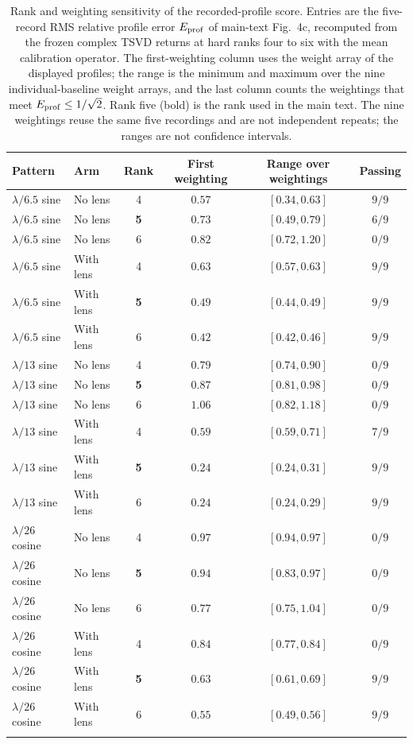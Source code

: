 \documentclass[pdflatex,sn-nature]{sn-jnl}%
\begin{document}
\begin{table}[p]
\centering
\caption{\label{tab:rank_sensitivity}Rank and weighting sensitivity of the recorded-profile score. Entries are the five-record RMS relative profile error $E_{\rm prof}$ of main-text Fig.~4c, recomputed from the frozen complex TSVD returns at hard ranks four to six with the mean calibration operator. The first-weighting column uses the weight array of the displayed profiles; the range is the minimum and maximum over the nine individual-baseline weight arrays, and the last column counts the weightings that meet $E_{\rm prof}\le1/\sqrt2$. Rank five (bold) is the rank used in the main text. The nine weightings reuse the same five recordings and are not independent repeats; the ranges are not confidence intervals.}
\setlength{\tabcolsep}{5pt}
\begin{tabular}{llcccc}
\toprule
Pattern & Arm & Rank & First weighting & Range over weightings & Passing\\
\midrule
$\lambda/6.5$ sine & No lens & 4 & $0.57$ & $[0.34, 0.63]$ & $9/9$ \\
$\lambda/6.5$ sine & No lens & \textbf{5} & $0.73$ & $[0.49, 0.79]$ & $6/9$ \\
$\lambda/6.5$ sine & No lens & 6 & $0.82$ & $[0.72, 1.20]$ & $0/9$ \\
\addlinespace[2pt]
$\lambda/6.5$ sine & With lens & 4 & $0.63$ & $[0.57, 0.63]$ & $9/9$ \\
$\lambda/6.5$ sine & With lens & \textbf{5} & $0.49$ & $[0.44, 0.49]$ & $9/9$ \\
$\lambda/6.5$ sine & With lens & 6 & $0.42$ & $[0.42, 0.46]$ & $9/9$ \\
\addlinespace[2pt]
$\lambda/13$ sine & No lens & 4 & $0.79$ & $[0.74, 0.90]$ & $0/9$ \\
$\lambda/13$ sine & No lens & \textbf{5} & $0.87$ & $[0.81, 0.98]$ & $0/9$ \\
$\lambda/13$ sine & No lens & 6 & $1.06$ & $[0.82, 1.18]$ & $0/9$ \\
\addlinespace[2pt]
$\lambda/13$ sine & With lens & 4 & $0.59$ & $[0.59, 0.71]$ & $7/9$ \\
$\lambda/13$ sine & With lens & \textbf{5} & $0.24$ & $[0.24, 0.31]$ & $9/9$ \\
$\lambda/13$ sine & With lens & 6 & $0.24$ & $[0.24, 0.29]$ & $9/9$ \\
\addlinespace[2pt]
$\lambda/26$ cosine & No lens & 4 & $0.97$ & $[0.94, 0.97]$ & $0/9$ \\
$\lambda/26$ cosine & No lens & \textbf{5} & $0.94$ & $[0.83, 0.97]$ & $0/9$ \\
$\lambda/26$ cosine & No lens & 6 & $0.77$ & $[0.75, 1.04]$ & $0/9$ \\
\addlinespace[2pt]
$\lambda/26$ cosine & With lens & 4 & $0.84$ & $[0.77, 0.84]$ & $0/9$ \\
$\lambda/26$ cosine & With lens & \textbf{5} & $0.63$ & $[0.61, 0.69]$ & $9/9$ \\
$\lambda/26$ cosine & With lens & 6 & $0.55$ & $[0.49, 0.56]$ & $9/9$ \\
\addlinespace[2pt]
\bottomrule
\end{tabular}
\end{table}
\clearpage
\end{document}
